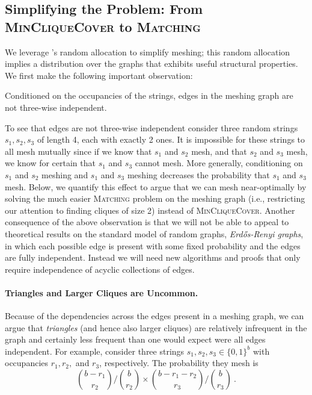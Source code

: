 \subsection{Simplifying the Problem: From \textsc{MinCliqueCover} to \textsc{Matching}}
\label{subsec:matching}
We leverage \Mesh{}'s random allocation to simplify meshing; this random
allocation implies a distribution over the graphs that exhibits useful
structural properties. We first make the following important observation:

\begin{observation}
Conditioned on the occupancies of the strings, edges in the meshing graph  are not three-wise independent.
\end{observation}

To see that edges are not three-wise independent consider three random
strings $s_1, s_2, s_3$ of length 4, each with exactly 2 ones. It is
impossible for these strings to all mesh mutually since if we know that $s_1$ and $s_2$ mesh,
and that $s_2$ and $s_3$ mesh, we know for certain that $s_1$ and
$s_3$ cannot mesh. More generally, conditioning on $s_1$ and $s_2$
meshing and $s_1$ and $s_3$ meshing decreases the probability that
$s_1$ and $s_3$ mesh.
Below, we quantify this
effect to argue that we can mesh near-optimally by solving the much
easier \textsc{Matching} problem on the meshing graph (i.e.,
restricting our attention to finding cliques of size 2) instead of
\textsc{MinCliqueCover}. Another consequence of the above observation is that we will not be able to appeal to  theoretical results on the standard model of random graphs, \emph{Erd\H{o}s-Renyi graphs}, in which  each possible edge is present with some fixed probability and the edges are fully independent. Instead we will need new algorithms and proofs that only require independence of acyclic collections of edges.

\paragraph{Triangles and Larger Cliques are Uncommon.}
Because of the dependencies across the edges present in a meshing
graph, we can argue that \emph{triangles} (and hence also larger
cliques) are relatively infrequent in the graph and certainly less
frequent than one would expect were all edges independent.  For
example, consider three strings $s_1, s_2, s_3\in \{0,1\}^b$ with
occupancies $r_1, r_2,$ and $r_3$, respectively. The probability they
mesh is
\[
{\binom{b-r_1}{r_2}} \big / {\binom{b}{r_2}} \times {\binom{b-r_{1}-r_2 }{r_3}} \big / {\binom{b}{r_3}} \ . \]

